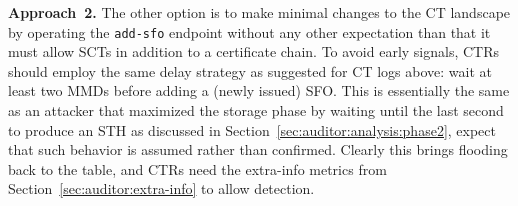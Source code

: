 \textbf{Approach~2.}  The other option is to make minimal changes to the CT
landscape by operating the \texttt{add-sfo} endpoint without any other
expectation than that it must allow SCTs in addition to a certificate chain.
To avoid early signals, CTRs should employ the same delay strategy as suggested
for CT logs above:
	wait at least two MMDs before adding a (newly issued) SFO.
This is essentially the same as an attacker that maximized the storage phase
by waiting until the last second to produce an STH as discussed in
Section~\ref{sec:auditor:analysis:phase2}, expect that such behavior is assumed
rather than confirmed.  Clearly this brings flooding back to the table, and CTRs
need the extra-info metrics from Section~\ref{sec:auditor:extra-info} to
allow detection.
